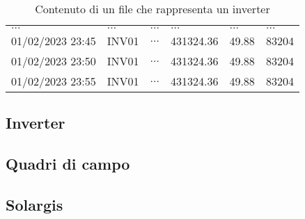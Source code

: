 \begin{table}[H]
\begin{center}
\begin{tabular}[c]{l|l|l|l|l|l}
            $\ldots$                                 &
            $\ldots$                                            &
            $\ldots$                                         &
            $\ldots$                                        &
            $\ldots$&
            $\ldots$                                              \\
            01/02/2023 23:45                                 &
            INV01                                            &
            $\ldots$                                         &
            431324.36                                        &
            49.88 &
            83204                                              \\
            01/02/2023 23:50                                 &
            INV01                                            &
            $\ldots$                                         &
            431324.36                                        &
            49.88 &
            83204                                              \\
            01/02/2023 23:55                                 &
            INV01                                            &
            $\ldots$                                         &
            431324.36                                        &
            49.88 &
            83204                                              \\
            \hline
        \end{tabular}
        \caption{Contenuto di un file che rappresenta un inverter}\label{tab:invsunto}
    \end{center}
\end{table}


\subsection{Inverter}
\subsection{Quadri di campo}
\subsection{Solargis}
